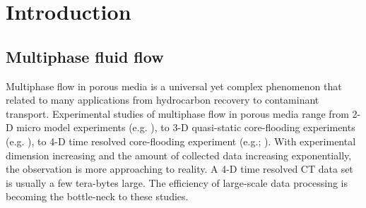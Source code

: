 \documentclass[draft,linenumbers]{agujournal2018}
\begin{document}
%
%

%


%
%
%
%


\section{Introduction}
\subsection{Multiphase fluid flow}
Multiphase flow in porous media is a universal yet complex phenomenon that related to many applications from hydrocarbon recovery to contaminant transport. Experimental studies of multiphase flow in porous media range from 2-D micro model experiments (e.g. \citet{keller1997micromodel}), to 3-D quasi-static core-flooding experiments (e.g. \citet{ott2012core}), to 4-D time resolved core-flooding experiment (e.g.\citet{pak2015droplet}; \citet{berg2014multiphase}). With experimental dimension increasing and the amount of collected data increasing exponentially, the observation is more approaching to reality. A 4-D time resolved CT data set is usually a few tera-bytes large. The efficiency of large-scale data processing is becoming the bottle-neck to these studies.
\end{document}
